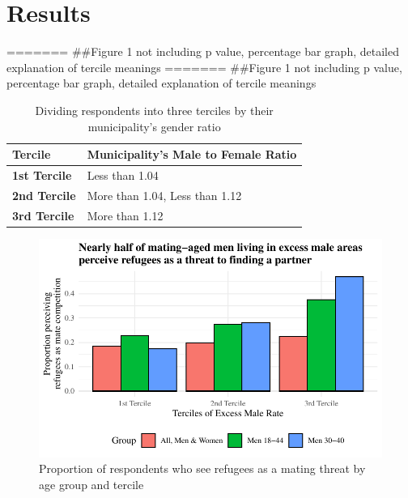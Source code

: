 \documentclass[
]{article}
\begin{document}
\hypertarget{results}{%
\section{Results}\label{results}}

======= \#\#Figure 1 not including p value, percentage bar graph,
detailed explanation of tercile meanings ======= \#\#Figure 1 not
including p value, percentage bar graph, detailed explanation of tercile
meanings

\clearpage

\renewcommand{\arraystretch}{2}

\hypertarget{tbl-terc}{}
\begin{table}
\caption{\label{tbl-terc}Dividing respondents into three terciles by their municipality's gender
ratio }\tabularnewline

\centering
\begin{tabular}{>{\raggedright\arraybackslash}p{10em}>{\raggedright\arraybackslash}p{20em}}
\toprule
Tercile & Municipality's Male to Female Ratio\\
\midrule
\textbf{1st Tercile} & Less than 1.04\\
\textbf{2nd Tercile} & More than 1.04, Less than 1.12\\
\textbf{3rd Tercile} & More than 1.12\\
\bottomrule
\end{tabular}
\end{table}

\begin{figure}

{\centering \includegraphics{paper_files/figure-pdf/fig-excess-1.pdf}

}

\caption{\label{fig-excess}Proportion of respondents who see refugees as
a mating threat by age group and tercile}

\end{figure}
\end{document}
